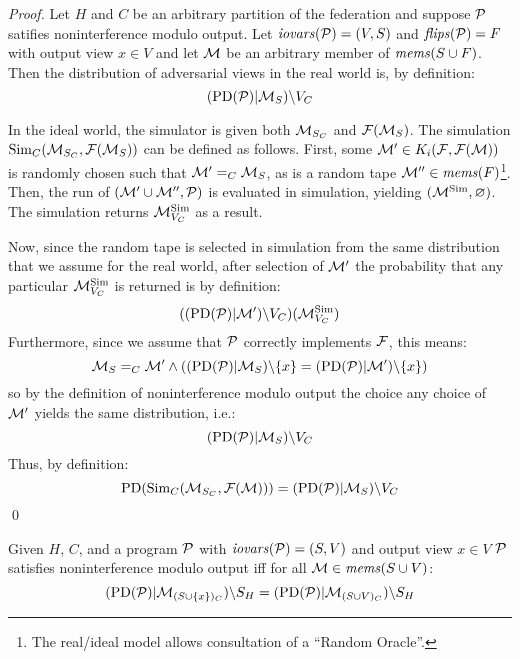 \begin{proof}
  Let $H$ and $C$ be an arbitrary partition of the federation and
  suppose $\mathcal{P}$ satifies noninterference modulo output. Let
  $\mathit{iovars}(\mathcal{P}) = (V,S)$ and $\mathit{flips}(\mathcal{P}) = F$ with output view $x
  \in V$ and let $\mathcal{M}$ be an arbitrary member of $\mathit{mems}(S \cup
  F)$. Then the distribution of adversarial views in the real world
  is, by definition:
  $$(\mathrm{PD}(\mathcal{P})|\mathcal{M}_S)\backslash V_C$$

  In the ideal world, the simulator is given both $\mathcal{M}_{S_C}$ and
  $\mathcal{F}(\mathcal{M}_S)$.  The simulation $\mathrm{Sim}_C(\mathcal{M}_{S_C},
  \mathcal{F}(\mathcal{M}_S))$ can be defined as follows. First, some $\mathcal{M}'
  \in K_i(\mathcal{F},\mathcal{F}(\mathcal{M}))$ is randomly chosen such that
  $\mathcal{M}' =_C \mathcal{M}_S$, as is a random tape $\mathcal{M}'' \in
  \mathit{mems}(F)$\footnote{The real/ideal model allows consultation of a
  ``Random Oracle''.}. Then, the run of $(\mathcal{M}' \cup \mathcal{M}'',
  \mathcal{P})$ is evaluated in simulation, yielding $(\mathcal{M}^{\mathrm{Sim}},\varnothing)$.
  The simulation returns $\mathcal{M}^{\mathrm{Sim}}_{V_C}$ as a result.

  Now, since the random tape is selected in simulation from the same distribution
  that we assume for the real world, after selection of $\mathcal{M}'$ the
  probability that any particular $\mathcal{M}^{\mathrm{Sim}}_{V_C}$ is returned is by definition:
  $$
   ((\mathrm{PD}(\mathcal{P})|\mathcal{M}')\backslash V_C)(\mathcal{M}^{\mathrm{Sim}}_{V_C})
  $$
  Furthermore, since we assume that $\mathcal{P}$ correctly implements $\mathcal{F}$, this
  means:
  $$
  \mathcal{M}_S =_C \mathcal{M}' \wedge
     ((\mathrm{PD}(\mathcal{P})|\mathcal{M}_S)\backslash\{ x \} =
      (\mathrm{PD}(\mathcal{P})|\mathcal{M}')\backslash\{ x \})
  $$
  so by the definition of noninterference modulo output the choice
  any choice of $\mathcal{M}'$ yields the same distribution, i.e.:
  $$(\mathrm{PD}(\mathcal{P})|\mathcal{M}_S)\backslash V_C$$
  Thus, by definition:
  $$
   \mathrm{PD}(\mathrm{Sim}_C(\mathcal{M}_{S_C},\mathcal{F}(\mathcal{M}))) = (\mathrm{PD}(\mathcal{P})|\mathcal{M}_S)\backslash V_C
  $$
  \qed
\end{proof}


\begin{lemma}
  Given $H$, $C$, and a program $\mathcal{P}$ with $\mathit{iovars}(\mathcal{P}) = (S,V)$ and
  output view $x \in V$
  $\mathcal{P}$ satisfies noninterference modulo output iff for all
  $\mathcal{M} \in \mathit{mems}(S \cup V)$:
  $$(\mathrm{PD}(\mathcal{P})|\mathcal{M}_{(S \cup \{x\})_C})\backslash S_H =
    (\mathrm{PD}(\mathcal{P})|\mathcal{M}_{(S\cup V)_C})\backslash S_H $$
\end{lemma}
